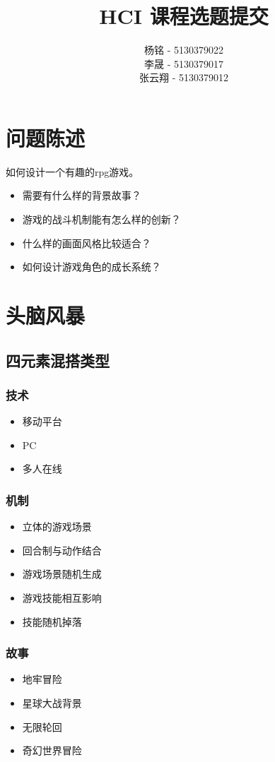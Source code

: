 \documentclass{article}
\author{杨铭 - 5130379022\\
	李晟 - 5130379017\\
	张云翔 - 5130379012}
\title{HCI 课程选题提交}
\begin{document}
\maketitle
\section{问题陈述}
如何设计一个有趣的rpg游戏。
\begin{itemize}
	\item 需要有什么样的背景故事？
	\item 游戏的战斗机制能有怎么样的创新？
	\item 什么样的画面风格比较适合？
	\item 如何设计游戏角色的成长系统？
\end{itemize}
\section{头脑风暴}
\subsection{四元素混搭类型}
\subsubsection{技术}
\begin{itemize}
	\item 移动平台
	\item PC
	\item 多人在线
\end{itemize}
\subsubsection{机制}
\begin{itemize}
	\item 立体的游戏场景
	\item 回合制与动作结合
	\item 游戏场景随机生成
	\item 游戏技能相互影响
	\item 技能随机掉落
\end{itemize}
\subsubsection{故事}
\begin{itemize}
	\item 地牢冒险
	\item 星球大战背景
	\item 无限轮回
	\item 奇幻世界冒险
\end{itemize}
\end{document}
